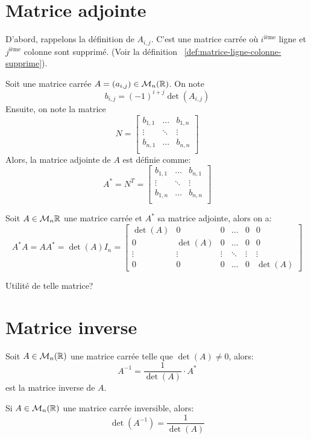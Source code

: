 \section{Matrice adjointe}
D'abord, rappelons la définition de $A_{i,j}$. C'est une matrice carrée où $i^{\text{ième}}$ ligne et $j^{\text{ième}}$ colonne sont supprimé. (Voir la définition ~\ref{def:matrice-ligne-colonne-supprime}).
\begin{definition}
    Soit une matrice carrée $A = (a_{i, j}) \in \mathcal{M}_n(\mathbb{R})$. On note
    \[
        b_{i, j} = (-1)^{i + j}\det(A_{i, j})
    \] 
    Ensuite, on note la matrice
    \[
        N = 
        \begin{bmatrix} 
            b_{1,1} & \ldots & b_{1, n}\\
            \vdots  & \ddots & \vdots  \\
            b_{n,1} & \ldots & b_{n, n}\\
        \end{bmatrix} 
    \] 
    Alors, la matrice adjointe de $A$ est définie comme:
    \[
        A^{*} = N^{T} = 
        \begin{bmatrix} 
            b_{1,1} & \ldots & b_{n, 1}\\
            \vdots  & \ddots & \vdots  \\
            b_{1,n} & \ldots & b_{n, n}\\
        \end{bmatrix} 
    \] 
\end{definition}

\begin{theorem}
    Soit $A \in \mathcal{M}_n{\mathbb{R}}$ une matrice carrée et $A^{*}$ sa matrice adjointe, alors on a:
     \[
         A^{*}A = A A^{*} = \det(A)I_n = 
         \begin{bmatrix}  
             \det(A) & 0        & 0      & \ldots & 0 & 0\\
             0       & \det(A)  & 0      & \ldots & 0 & 0\\
             \vdots  & \vdots   & \vdots & \ddots & \vdots & \vdots\\
             0       & 0        & 0      & \ldots & 0      & \det(A)
         \end{bmatrix}  
    \] 
\end{theorem}
Utilité de telle matrice?
\section{Matrice inverse}
\begin{theorem}
    Soit $A \in \mathcal{M}_n(\mathbb{R})$ une matrice carrée telle que $\det(A) \neq 0$, alors:
    \[
        A^{-1} = \frac{1}{\det(A)}\cdot A^{*}
    \] 
    est la matrice inverse de $A$.
\end{theorem}
\begin{corollary}
   Si $A \in \mathcal{M}_n(\mathbb{R})$ une matrice carrée inversible, alors:
   \[
       \det(A^{-1}) = \frac{1}{\det(A)}
   \] 
\end{corollary}
